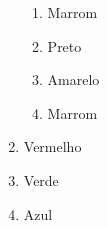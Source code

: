 \documentclass[10pt]{beamer}
\begin{document}
\begin{frame}
\begin{columns}
\begin{column}{4cm}
\begin{enumerate}
                \begin{enumerate}
                    \item <3> Marrom \theordem
                    \item Preto \theordem
                    \item <2> Amarelo \theordem
                    \item Marrom \theordem
                \end{enumerate}
                \item Vermelho \theordem
                \item Verde \theordem
                \item Azul \theordem
            \end{enumerate}
        \end{column}
    \end{columns}


\end{frame}

\end{document}
